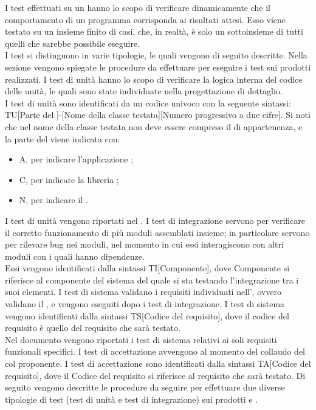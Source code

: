 		I test effettuati su un   hanno lo scopo di verificare dinamicamente che il comportamento di un programma corrisponda ai risultati attesi. Esso viene testato su un insieme finito di casi, che, in realtà, è solo un sottoinsieme di tutti quelli che sarebbe possibile eseguire.\\
		I test si distinguono in varie tipologie, le quali vengono di seguito descritte. Nella sezione  vengono spiegate le procedure da effettuare per eseguire i test sui prodotti realizzati.
				I test di unità hanno lo scopo di verificare la logica interna del codice delle unità, le quali sono state individuate nella progettazione di dettaglio. \\
				I test di unità sono identificati da un codice univoco con la seguente sintassi: TU[Parte del ]-[Nome della classe testata][Numero progressivo a due cifre]. Si noti che nel nome della classe testata non deve essere compreso il  di appartenenza, e la parte del  viene indicata con:
				\begin{itemize}
					\item A, per indicare l'applicazione ;
					\item C, per indicare la libreria ;
					\item N, per indicare il  .
				\end{itemize}
				I test di unità vengono riportati nel .
				I test di integrazione servono per verificare il corretto funzionamento di più moduli assemblati insieme; in particolare servono per rilevare bug nei moduli, nel momento in cui essi interagiscono con altri moduli con i quali hanno dipendenze.\\
				Essi vengono identificati dalla sintassi TI[Componente], dove Componente si riferisce al componente del sistema del quale si sta testando l'integrazione tra i suoi elementi.
				I test di sistema validano i requisiti individuati nell', ovvero validano il  , e vengono eseguiti dopo i test di integrazione.
				I test di sistema vengono identificati dalla sintassi TS[Codice del requisito], dove il codice del requisito è quello del requisito che sarà testato.\\
				Nel documento  vengono riportati i test di sistema relativi ai soli requisiti funzionali specifici.
				I test di accettazione avvengono al momento del collaudo del  col proponente.
				I test di accettazione sono identificati dalla sintassi TA[Codice del requisito], dove il Codice del requisito si riferisce al requisito che sarà testato.
			 \label{sec:procedure}
			Di seguito vengono descritte le procedure da seguire per effettuare due diverse tipologie di test (test di unità e test di integrazione) sui prodotti \textit{} e \textit{}.
			
